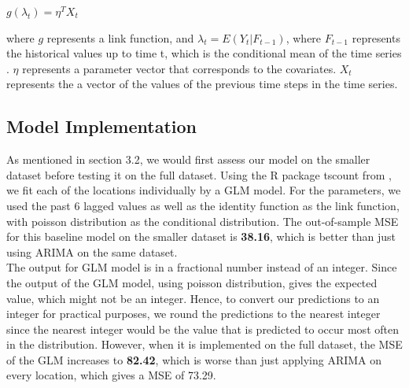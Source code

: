 \documentclass[nonblindrev,msom]{informs3} %
\begin{document}
\begin{center}
    $\displaystyle g(\lambda_t)= \eta^T X_t$
\end{center}

\noindent where $g$ represents a link function, and $\lambda_t = E(Y_t | F_{t-1})$, where $F_{t-1}$ represents the historical values up to time t, which is the conditional mean of the time series . $\eta$ represents a parameter vector that corresponds to the covariates. $X_t$ represents the a vector of the values of the previous time steps in the time series.




\subsection{Model Implementation}
\noindent As mentioned in section 3.2, we would first assess our model on the smaller dataset before testing it on the full dataset. Using the R package tscount from \cite{Tobias2017}, we fit each of the locations individually by a GLM model. For the parameters, we used the past 6 lagged values as well as the identity function as the link function, with poisson distribution as the conditional distribution. The out-of-sample MSE for this baseline model on the smaller dataset is \textbf{38.16}, which is better than just using ARIMA on the same dataset.  \\

\noindent The output for GLM model is in a fractional number instead of an integer. Since the output of the GLM model, using poisson distribution, gives the expected value, which might not be an integer. Hence, to convert our predictions to an integer for practical purposes, we round the predictions to the nearest integer since the nearest integer would be the value that is predicted to occur most often in the distribution. 
\noindent However, when it is implemented on the full dataset, the MSE of the GLM increases to \textbf{82.42}, which is worse than just applying ARIMA on every location, which gives a MSE of 73.29. 
\end{document}

